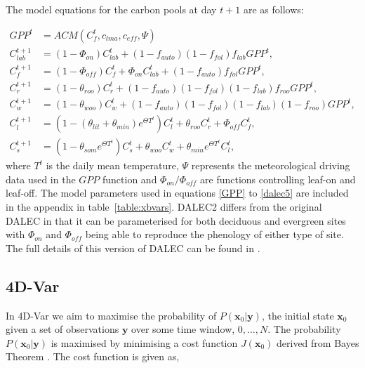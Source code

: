 \documentclass[11pt]{article}
\begin{document}
The model equations for the carbon pools at day $t+1$ are as follows:

\begin{align}
GPP^{t} &= ACM(C_f^{t}, c_{lma}, c_{eff}, \Psi) \label{GPP}
\\C_{lab}^{t+1}&=(1-\Phi _{on})C_{lab}^{t}+(1-f_{auto})(1-f_{fol})f_{lab}GPP^{t}, \label{daleclab}
\\C_f^{t+1}&=(1-\Phi_{off})C_f^{t}+\Phi_{on}C_{lab}^{t}+(1-f_{auto})f_{fol}GPP^{t}, \label{dalec1}
\\C_r^{t+1}&=(1-\theta_{roo})C_r^{t}+(1-f_{auto})(1-f_{fol})(1-f_{lab})f_{roo}GPP^{t}, 
\\C_w^{t+1}&=(1-\theta_{woo})C_w^{t}+(1-f_{auto})(1-f_{fol})(1-f_{lab})(1-f_{roo})GPP^{t}, 
\\C_l^{t+1}&=(1-(\theta_{lit}+\theta_{min})e^{\Theta T^{t}})C_l^{t}+\theta_{roo}C_r^{t}+\Phi_{off}C_f^{t}, 
\\C_s^{t+1}&=(1-\theta_{som}e^{\Theta T^{t}})C_s^{t}+\theta_{woo}C_w^{t}+\theta_{min}e^{\Theta T^{t}}C_l^{t}, \label{dalec5}
\end{align}
where $T^{t}$ is the daily mean temperature, $\Psi$ represents the meteorological driving data used in the $GPP$ function and $\Phi_{on} / \Phi_{off}$ are functions controlling leaf-on and leaf-off. The model parameters used in equations \ref{GPP} to \ref{dalec5} are included in the appendix in table~\ref{table:xbvars}. DALEC2 differs from the original DALEC in that it can be parameterised for both deciduous and evergreen sites with $\Phi_{on}$ and $\Phi_{off}$ being able to reproduce the phenology of either type of site. The full details of this version of DALEC can be found in \cite{Bloom2015}. 

\subsection{4D-Var} \label{4dvar}

In 4D-Var we aim to maximise the probability of $P(\textbf{x}_0|\textbf{y})$, the initial state $\textbf{x}_0$ given a set of observations $\textbf{y}$ over some time window, $0, \dots, N$. The probability $P(\textbf{x}_0|\textbf{y})$ is maximised by minimising a cost function $J(\textbf{x}_0)$ derived from Bayes Theorem \citep{lawless2013}. The cost function is given as,
\end{document}
